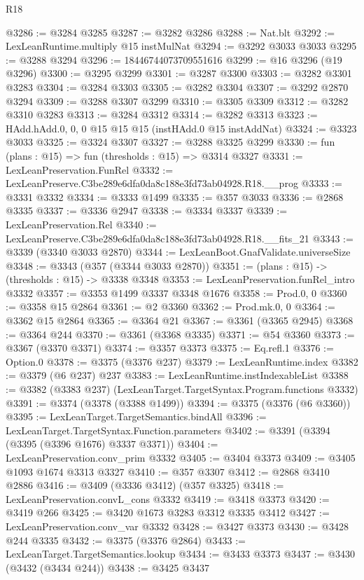 \begin{lexlean}{R18}
\begin{coremodule}
{{{{{{{{{{{{{{{{{{{@3286 := @3284 @3285
@3287 := @3282 @3286
@3288 := Nat.blt
@3292 := LexLeanRuntime.multiply @15 instMulNat
@3294 := @3292 @3033 @3033
@3295 := @3288 @3294
@3296 := 18446744073709551616
@3299 := @16 @3296 (@19 @3296)
@3300 := @3295 @3299
@3301 := @3287 @3300
@3303 := @3282 @3301 @3283
@3304 := @3284 @3303
@3305 := @3282 @3304
@3307 := @3292 @2870 @3294
@3309 := @3288 @3307 @3299
@3310 := @3305 @3309
@3312 := @3282 @3310 @3283
@3313 := @3284 @3312
@3314 := @3282 @3313
@3323 := HAdd.hAdd.{0, 0, 0} @15 @15 @15 (instHAdd.{0} @15 instAddNat)
@3324 := @3323 @3033
@3325 := @3324 @3307
@3327 := @3288 @3325 @3299
@3330 := fun (plans : @15) => fun (thresholds : @15) => @3314 @3327
@3331 := LexLeanPreservation.FunRel
@3332 := LexLeanPreserve.C3be289e6dfa0da8c188e3fd73ab04928.R18.__prog
@3333 := @3331 @3332
@3334 := @3333 @1499
@3335 := @357 @3033
@3336 := @2868 @3335
@3337 := @3336 @2947
@3338 := @3334 @3337
@3339 := LexLeanPreservation.Rel
@3340 := LexLeanPreserve.C3be289e6dfa0da8c188e3fd73ab04928.R18.__fits_21
@3343 := @3339 (@3340 @3033 @2870)
@3344 := LexLeanBoot.GnafValidate.universeSize
@3348 := @3343 (@357 (@3344 @3033 @2870))
@3351 := (plans : @15) -> (thresholds : @15) -> @3338 @3348
@3353 := LexLeanPreservation.funRel_intro @3332
@3357 := @3353 @1499 @3337 @3348 @1676
@3358 := Prod.{0, 0}
@3360 := @3358 @15 @2864
@3361 := @2 @3360
@3362 := Prod.mk.{0, 0}
@3364 := @3362 @15 @2864
@3365 := @3364 @21
@3367 := @3361 (@3365 @2945)
@3368 := @3364 @244
@3370 := @3361 (@3368 @3335)
@3371 := @54 @3360
@3373 := @3367 (@3370 @3371)
@3374 := @3357 @3373
@3375 := Eq.refl.{1}
@3376 := Option.{0}
@3378 := @3375 (@3376 @237)
@3379 := LexLeanRuntime.index
@3382 := @3379 (@6 @237) @237
@3383 := LexLeanRuntime.instIndexableList
@3388 := @3382 (@3383 @237) (LexLeanTarget.TargetSyntax.Program.functions @3332)
@3391 := @3374 (@3378 (@3388 @1499))
@3394 := @3375 (@3376 (@6 @3360))
@3395 := LexLeanTarget.TargetSemantics.bindAll
@3396 := LexLeanTarget.TargetSyntax.Function.parameters
@3402 := @3391 (@3394 (@3395 (@3396 @1676) @3337 @3371))
@3404 := LexLeanPreservation.conv_prim @3332
@3405 := @3404 @3373
@3409 := @3405 @1093 @1674 @3313 @3327
@3410 := @357 @3307
@3412 := @2868 @3410 @2886
@3416 := @3409 (@3336 @3412) (@357 @3325)
@3418 := LexLeanPreservation.convL_cons @3332
@3419 := @3418 @3373
@3420 := @3419 @266
@3425 := @3420 @1673 @3283 @3312 @3335 @3412
@3427 := LexLeanPreservation.conv_var @3332
@3428 := @3427 @3373
@3430 := @3428 @244 @3335
@3432 := @3375 (@3376 @2864)
@3433 := LexLeanTarget.TargetSemantics.lookup
@3434 := @3433 @3373
@3437 := @3430 (@3432 (@3434 @244))
@3438 := @3425 @3437
}}}}}}}}}}}}}}}}}}}
\end{coremodule}
\end{lexlean}
